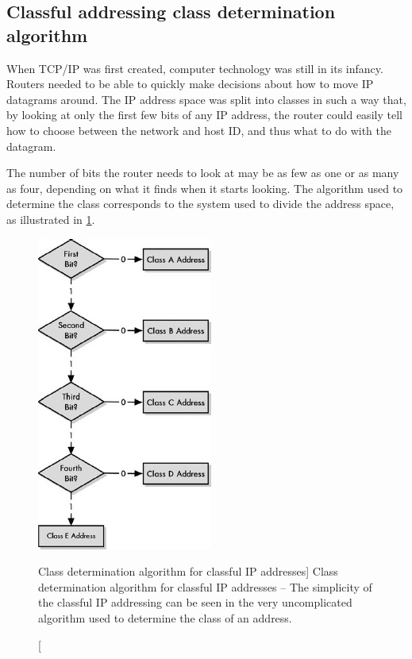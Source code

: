 \subsection{Classful addressing class determination algorithm}

When TCP/IP was first created, computer technology was still in its
infancy. Routers needed to be able to quickly make decisions about how
to move IP datagrams around. The IP address space was split into classes
in such a way that, by looking at only the first few bits of any IP
address, the router could easily tell how to choose between the network
and host ID, and thus what to do with the datagram.

The number of bits the router needs to look at may be as few as one or
as many as four, depending on what it finds when it starts looking. The
algorithm used to determine the class corresponds to the system used to
divide the address space, as illustrated in \cref{fig:class-determination}.


\begin{figure}
   \centering
   \includegraphics[width=.5\textwidth]{images/class-determination.jpg}
   \caption
      [Class determination algorithm for classful IP addresses]
      {Class determination algorithm for classful IP addresses -- The simplicity of the classful IP addressing can be seen in the very uncomplicated algorithm used to determine the class of an address.}
   \label{fig:class-determination}
\end{figure}


